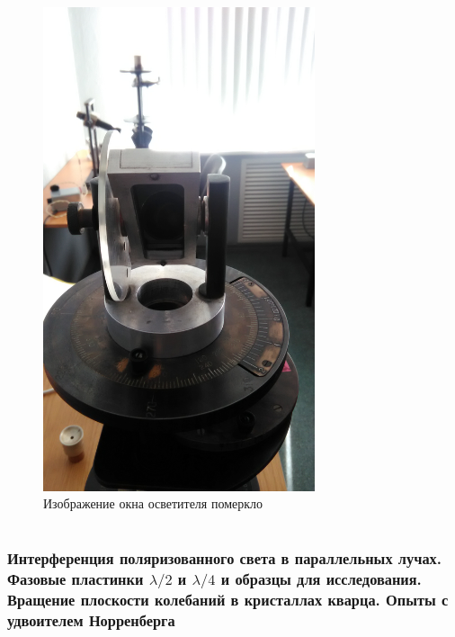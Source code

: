 \begin{figure}[H]
	\centering
	\includegraphics[width=8cm]{pic/b2.jpg}
	\caption{Изображение окна осветителя померкло}
	\label{fig:figure4}
\end{figure}

\part{}
\section{Интерференция поляризованного света в параллельных лучах.
Фазовые пластинки $\lambda/2$ и $\lambda/4$ и образцы для исследования. Вращение плоскости колебаний в кристаллах кварца. Опыты с удвоителем Норренберга}

